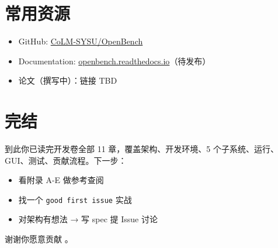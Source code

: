 \section{常用资源}

\begin{itemize}
  \item GitHub: \href{https://github.com/CoLM-SYSU/OpenBench}{CoLM-SYSU/OpenBench}
  \item Documentation: \href{https://openbench.readthedocs.io}{openbench.readthedocs.io}（待发布）
  \item 论文（撰写中）：链接 TBD
\end{itemize}

\section{完结}

到此你已读完开发卷全部 11 章，覆盖架构、开发环境、5 个子系统、运行、GUI、测试、贡献流程。下一步：

\begin{itemize}
  \item 看附录 A-E 做参考查阅
  \item 找一个 \texttt{good first issue} 实战
  \item 对架构有想法 → 写 spec 提 Issue 讨论
\end{itemize}

谢谢你愿意贡献 \openbench{}。
